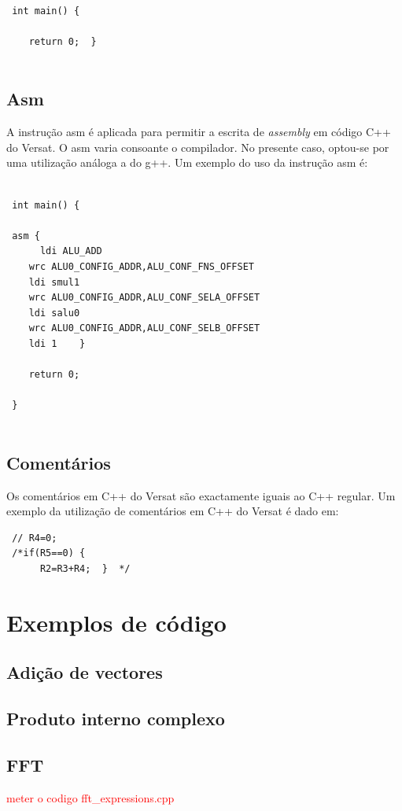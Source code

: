 \begin{lstlisting}
 
 int main() {
 
    return 0;  }
 
\end{lstlisting}



\section{Asm}
\label{section:return}

A instrução asm é aplicada para permitir a escrita de {\it assembly} em código C++ do Versat. O asm varia consoante o compilador. No presente caso, optou-se
por uma utilização análoga a do g++. Um exemplo do uso da instrução asm é:

\begin{lstlisting}
 
 int main() {
 
 asm {
      ldi ALU_ADD
	wrc ALU0_CONFIG_ADDR,ALU_CONF_FNS_OFFSET
	ldi smul1
	wrc ALU0_CONFIG_ADDR,ALU_CONF_SELA_OFFSET
	ldi salu0
	wrc ALU0_CONFIG_ADDR,ALU_CONF_SELB_OFFSET
	ldi 1    }
	
	return 0;
 
 }
 
\end{lstlisting}

\section{Comentários}
\label{chapter:comentarios}

Os comentários em C++ do Versat são exactamente iguais ao C++ regular. Um exemplo da utilização de comentários em C++ do Versat é dado em:

\begin{lstlisting}
 // R4=0;
 /*if(R5==0) {
      R2=R3+R4;  }  */
\end{lstlisting}



\chapter{Exemplos de código}
\label{chapter:exemplos de codigo}


\section{Adição de vectores}
\label{section:vec_add}


\section{Produto interno complexo}
\label{section:complex_dot_product}


\section{FFT}
\label{section:FFT}

\textcolor{red}{meter o codigo fft\_expressions.cpp}

\cleardoublepage

